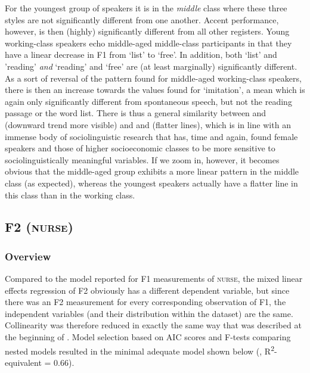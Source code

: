 For the youngest group of speakers it is in the \emph{middle} class where these three styles are not significantly different from one another.
Accent performance, however, is then (highly) significantly different from all other registers.
Young work\-ing-class speakers echo middle-aged middle-class participants in that they have a linear decrease in F1 from `list' to `free'.
In addition, both `list' and 'reading' \emph{and} `reading' and `free' are (at least marginally) significantly different.
As a sort of reversal of the pattern found for middle-aged working-class speakers, there is then an increase towards the values found for `imitation', a mean which is again only significantly different from spontaneous speech, but not the reading passage or the word list.
There is thus a general similarity between  and  (downward trend more visible) and  and  (flatter lines), which is in line with an immense body of sociolinguistic research that has, time and again, found female speakers and those of higher socioeconomic classes to be more sensitive to sociolinguistically meaningful variables.
If we zoom in, however, it becomes obvious that the middle-aged group exhibits a more linear pattern in the middle class (as expected), whereas the youngest speakers actually have a flatter line in this class than in the working class.

\subsection{F2 (\textsc{nurse})}
\label{sec.prod.res.vow.nurse.f2}

\subsubsection{Overview}
\label{sec.prod.res.vow.nurse.f2.overview}

Compared to the model reported for F1 measurements of \textsc{nurse}, the mixed linear effects regression of F2 obviously has a different dependent variable, but since there was an F2 measurement for every corresponding observation of F1, the independent variables (and their distribution within the dataset) are the same.
Collinearity was therefore reduced in exactly the same way that was described at the beginning of .
Model selection based on AIC scores and F-tests comparing nested models resulted in the minimal adequate model shown below (, R\textsuperscript{2}-equivalent = 0.66).


